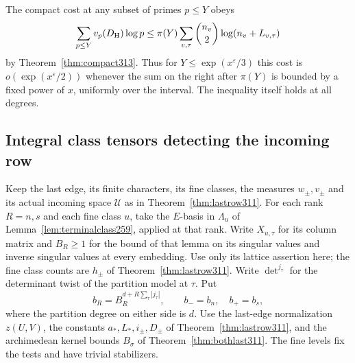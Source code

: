\documentclass[a4paper,11pt]{article}
\theoremstyle{definition}
\theoremstyle{remark}
\numberwithin{equation}{section}
\begin{document}
The compact cost at any subset of primes \(p\le Y\) obeys
\[
 \sum_{p\le Y} v_p(D_{\rm H})\log p
  \le \pi(Y)\sum_{v,\tau}\binom{n_v}{2}\log(n_v+L_{v,\tau})
\]
by Theorem~\ref{thm:compact313}. Thus for
\(Y\le\exp(x^\varepsilon/3)\) this cost is
\(o(\exp(x^\varepsilon/2))\) whenever the sum on the right
after \(\pi(Y)\) is bounded by a fixed power of \(x\), uniformly
over the interval. The inequality itself holds at all degrees.

\subsection{Integral class tensors detecting the incoming row}\label{nav:VI-63}
Keep the last edge, its finite characters, its fine classes,
the measures \(w_\pm,v_\pm\) and its actual incoming space
\(\mathcal U\) as in Theorem~\ref{thm:lastrow311}. For each
rank \(R=n,s\) and each fine class \(u\), take the \(E\)-basis
in \(\Lambda_u\) of Lemma~\ref{lem:terminalclass259}, applied
at that rank. Write \(X_{u,\tau}\) for its column matrix and
\(B_R\ge1\) for the bound of that lemma on its singular values
and inverse singular values at every embedding. Use only its
lattice assertion here; the fine class counts are \(h_\pm\)
of Theorem~\ref{thm:lastrow311}. Write \(\det^{j_\tau}\) for
the determinant twist of the partition model at \(\tau\).
Put
\[
       b_R=B_R^{d+R\sum_\tau |j_\tau|},\qquad
       b_-=b_n,\quad b_+=b_s,
\]
where the partition degree on either side is \(d\).
Use the last-edge normalization \(z(U,V)\), the constants
\(a_*,L_*,i_\pm,D_\pm\) of Theorem~\ref{thm:lastrow311}, and
the archimedean kernel bounds \(B_\sigma\) of
Theorem~\ref{thm:bothlast311}. The fine levels fix the tests
and have trivial stabilizers.
\end{document}
